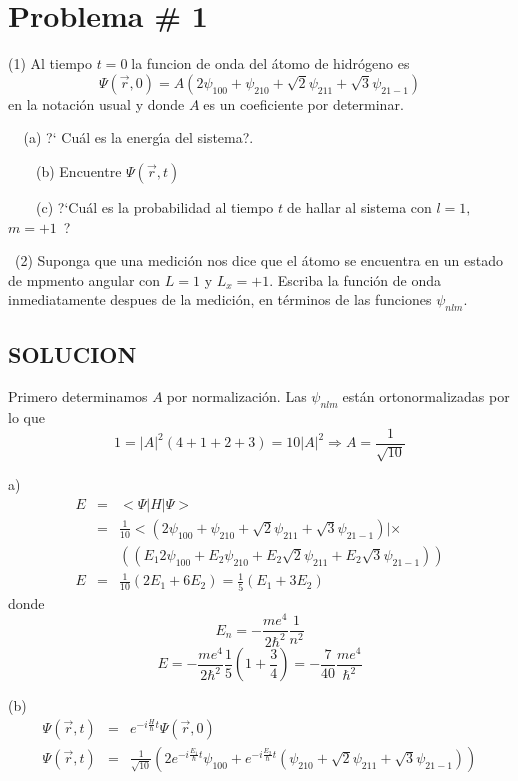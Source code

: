 \hoffset=-1.5cm
\textwidth=17cm



\section{Problema \# 1}

\bigskip 

(1) Al tiempo $t=0\;$la funcion de onda  del \'atomo de hidr\'ogeno es
\[
\Psi (\vec{r},0)=A\left( 2\psi _{100}+\psi _{210}+\sqrt{2}\psi _{211}+\sqrt{3%
}\psi _{21-1}\right) 
\]%
en la notaci\'on usual y donde $A\;$es un coeficiente por determinar.

$\;\;\;\;$(a) ?` Cu\'al es la energ\'\i a del sistema?.

\ \ \ \ (b) Encuentre $\Psi (\vec{r},t)$

\ \ \ \ (c) ?`Cu\'al es la probabilidad al tiempo $t\;$de hallar al sistema con $%
l=1,$\ $m=+1$\ ?

\ (2) Suponga que una medici\'on nos dice que el \'atomo se encuentra en un
estado de mpmento angular con  $L=1$ y $L_{x}=+1$.  Escriba la funci\'on de onda inmediatamente
despues de la medici\'on, en t\'erminos de las funciones $\psi _{nlm}.$

\subsection{\protect\bigskip SOLUCION}

Primero determinamos $A\;$por normalizaci\'on. Las $\psi _{nlm}\;$est\'an
ortonormalizadas por lo que%
\[
1=|A|^{2}\left( 4+1+2+3\right) =10|A|^{2}\Longrightarrow A=\frac{1}{\sqrt{10}%
}
\]

a) 
\begin{eqnarray*}
E &=&<\Psi |H|\Psi > \\
&=&\frac{1}{10}<\left( 2\psi _{100}+\psi _{210}+\sqrt{2}\psi _{211}+\sqrt{3}%
\psi _{21-1}\right) |\times  \\
&&\left( \left( E_{1}2\psi _{100}+E_{2}\psi _{210}+E_{2}\sqrt{2}\psi
_{211}+E_{2}\sqrt{3}\psi _{21-1}\right) \right)  \\
E &=&\frac{1}{10}\left( 2E_{1}+6E_{2}\right) =\frac{1}{5}(E_{1}+3E_{2})
\end{eqnarray*}%
donde%
\[
E_{n}=-\frac{me^{4}}{2\hbar ^{2}}\frac{1}{n^{2}}
\]%
\[
E=-\frac{me^{4}}{2\hbar ^{2}}\frac{1}{5}\left( 1+\frac{3}{4}\right) =-\frac{7%
}{40}\frac{me^{4}}{\hbar ^{2}}
\]

(b)%
\begin{eqnarray*}
\Psi (\vec{r},t) &=&e^{-i\frac{H}{\hbar }t}\Psi (\vec{r},0) \\
\Psi (\vec{r},t) &=&\frac{1}{\sqrt{10}}\left( 2e^{-i\frac{E_{1}}{\hbar }%
t}\psi _{100}+e^{-i\frac{E_{2}}{\hbar }t}\left( \psi _{210}+\sqrt{2}\psi
_{211}+\sqrt{3}\psi _{21-1}\right) \right) 
\end{eqnarray*}

